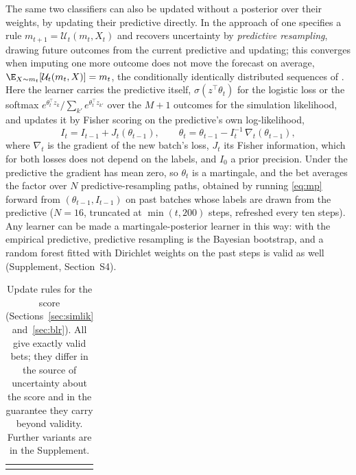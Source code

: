 The same two classifiers can also be updated without a posterior over their
weights, by updating their predictive directly. In the approach of
\citet{fong2023martingale} one specifies a rule
$m_{t+1} = \mathcal U_t(m_t, X_t)$ and recovers uncertainty by
\emph{predictive resampling}, drawing future outcomes from the current
predictive and updating; this converges when imputing one more outcome does
not move the forecast on average, $\E_{X \sim m_t}[\mathcal U_t(m_t, X)] = m_t$,
the conditionally identically distributed sequences of \citet{berti2004limit}.
Here the learner carries the predictive itself, $\sigma(z^\top\theta_t)$ for
the logistic loss or the softmax $e^{\theta_t^\top z_k}/\sum_{k'} e^{\theta_t^\top z_{k'}}$
over the $M+1$ outcomes for the simulation likelihood, and updates it by
Fisher scoring on the predictive's own log-likelihood,
\begin{equation}\label{eq:mp}
I_t = I_{t-1} + J_t(\theta_{t-1}), \qquad
\theta_t = \theta_{t-1} - I_t^{-1}\, \nabla_t(\theta_{t-1}),
\end{equation}
where $\nabla_t$ is the gradient of the new batch's loss, $J_t$ its Fisher
information, which for both losses does not depend on the labels, and $I_0$ a
prior precision. Under the predictive the gradient has mean zero, so
$\theta_t$ is a martingale, and the bet averages the factor over $N$
predictive-resampling paths, obtained by running \eqref{eq:mp} forward from
$(\theta_{t-1}, I_{t-1})$ on past batches whose labels are drawn from the
predictive ($N = 16$, truncated at $\min(t, 200)$ steps, refreshed every ten
steps). Any learner can be made a martingale-posterior learner in this way:
with the empirical predictive, predictive resampling is the Bayesian
bootstrap, and a random forest fitted with Dirichlet weights on the past steps
is valid as well (Supplement, Section~S4).

%
\begin{table}[t]
\centering
\caption{Update rules for the score (Sections~\ref{sec:simlik}
and~\ref{sec:blr}). All give exactly valid bets; they differ in the source of
uncertainty about the score and in the guarantee they carry beyond validity.
Further variants are in the Supplement.}
\label{tab:rules}
\small
\begin{tabular}{@{}c@{}}\resizebox{\textwidth}{!}{\usebox{\widetab}}\end{tabular}
\end{table}

